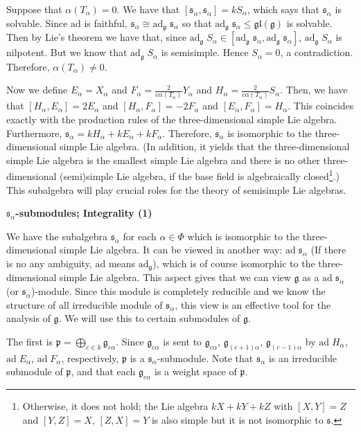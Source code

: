 \documentclass{article}
\newcommand{\lie}[1]{\mathfrak{#1}}
\newcommand{\ad}[1]{\mathrm{ad}\; #1}
\newcommand{\adu}[2]{\mathrm{ad}_{#1}\; #2}
\begin{document}
Suppose that $\alpha(T_\alpha) = 0$.
We have that $[\lie{s}_\alpha, \lie{s}_\alpha] = kS_\alpha$, which says that $\lie{s}_\alpha$ is solvable.
Since $\textrm{ad}$ is faithful, $\lie{s}_\alpha \cong \adu{\lie{g}}{\lie{s}_\alpha}$ so that $\adu{\lie{g}}{\lie{s}_\alpha} \le \lie{gl}(\lie{g})$ is solvable.
Then by Lie's theorem we have that, since $\adu{\lie{g}}{S_\alpha} \in [\adu{\lie{g}}{\lie{s}_\alpha}, \adu{\lie{g}}{\lie{s}_\alpha}]$, $\adu{\lie{g}}{S_\alpha}$ is nilpotent.
But we know that $\adu{\lie{g}}{S_\alpha}$ is semisimple.
Hence $S_\alpha = 0$, a contradiction.
Therefore, $\alpha(T_\alpha) \ne 0$.

Now we define $E_\alpha = X_\alpha$ and $F_\alpha = \frac{2}{c\alpha(T_\alpha)} Y_\alpha$ and $H_\alpha = \frac{2}{c\alpha(T_\alpha)} S_\alpha$.
Then, we have that $[H_\alpha, E_\alpha] = 2E_\alpha$ and $[H_\alpha, F_\alpha] = -2F_\alpha$ and $[E_\alpha, F_\alpha] = H_\alpha$.
This coincides exactly with the production rules of the three-dimensional simple Lie algebra.
Furthermore, $\lie{s}_\alpha = kH_\alpha + kE_\alpha + kF_\alpha$.
Therefore, $\lie{s}_\alpha$ is isomorphic to the three-dimensional simple Lie algebra.
(In addition, it yields that the three-dimensional simple Lie algebra is the smallest simple Lie algebra and there is no other three-dimensional (semi)simple Lie algebra, if the base field is algebraically closed\footnote{Otherwise, it does not hold; the Lie algebra $kX + kY + kZ$ with $[X, Y] = Z$ and $[Y, Z] = X$, $[Z, X] = Y$ is also simple but it is not isomorphic to $\lie{s}$.}.)
This subalgebra will play crucial roles for the theory of semisimple Lie algebras.

\newpage

\textbf{$\lie{s}_\alpha$-submodules; Integrality (1)}

We have the subalgebra $\lie{s}_\alpha$ for each $\alpha \in \Phi$ which is isomorphic to the three-dimensional simple Lie algebra.
It can be viewed in another way: $\ad{\lie{s}_\alpha}$ (If there is no any ambiguity, $\textrm{ad}$ means $\textrm{ad}_{\lie{g}}$), which is of course isomorphic to the three-dimensional simple Lie algebra.
This aspect gives that we can view $\lie{g}$ as a $\ad{\lie{s}_\alpha}$(or $\lie{s}_\alpha$)-module.
Since this module is completely reducible and we know the structure of all irreducible module of $\lie{s}_\alpha$, this view is an effective tool for the analysis of $\lie{g}$.
We will use this to certain submodules of $\lie{g}$.

The first is $\lie{p} = \bigoplus_{c \in k} \lie{g}_{c\alpha}$.
Since $\lie{g}_{c\alpha}$ is sent to $\lie{g}_{c\alpha}$, $\lie{g}_{(c+1)\alpha}$, $\lie{g}_{(c-1)\alpha}$ by $\ad{H_\alpha}$, $\ad{E_\alpha}$, $\ad{F_\alpha}$, respectively, $\lie{p}$ is a $\lie{s}_\alpha$-submodule.
Note that $\lie{s}_\alpha$ is an irreducible submodule of $\lie{p}$, and that each $\lie{g}_{c\alpha}$ is a weight space of $\lie{p}$.
\end{document}
